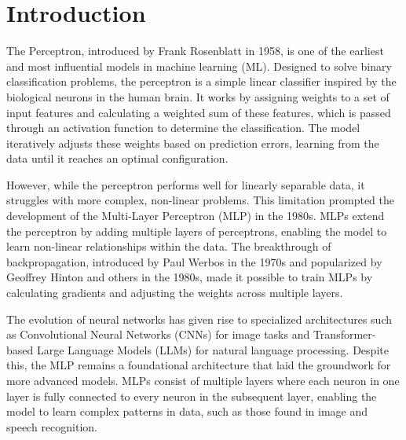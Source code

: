 
\chapter{Introduction} %

\label{Introduction} %


\newcommand{\keyword}[1]{\textbf{#1}}
\newcommand{\tabhead}[1]{\textbf{#1}}
\newcommand{\code}[1]{\texttt{#1}}
\newcommand{\file}[1]{\texttt{\bfseries#1}}
\newcommand{\option}[1]{\texttt{\itshape#1}}


The Perceptron, introduced by Frank Rosenblatt in 1958, is one of the earliest and most influential models in machine learning (ML). Designed to solve binary classification problems, the perceptron is a simple linear classifier inspired by the biological neurons in the human brain. It works by assigning weights to a set of input features and calculating a weighted sum of these features, which is passed through an activation function to determine the classification. The model iteratively adjusts these weights based on prediction errors, learning from the data until it reaches an optimal configuration.

However, while the perceptron performs well for linearly separable data, it struggles with more complex, non-linear problems. This limitation prompted the development of the Multi-Layer Perceptron (MLP) in the 1980s. MLPs extend the perceptron by adding multiple layers of perceptrons, enabling the model to learn non-linear relationships within the data. The breakthrough of backpropagation, introduced by Paul Werbos in the 1970s and popularized by Geoffrey Hinton and others in the 1980s, made it possible to train MLPs by calculating gradients and adjusting the weights across multiple layers.

The evolution of neural networks has given rise to specialized architectures such as Convolutional Neural Networks (CNNs) for image tasks and Transformer-based Large Language Models (LLMs) for natural language processing. Despite this, the MLP remains a foundational architecture that laid the groundwork for more advanced models. MLPs consist of multiple layers where each neuron in one layer is fully connected to every neuron in the subsequent layer, enabling the model to learn complex patterns in data, such as those found in image and speech recognition.

